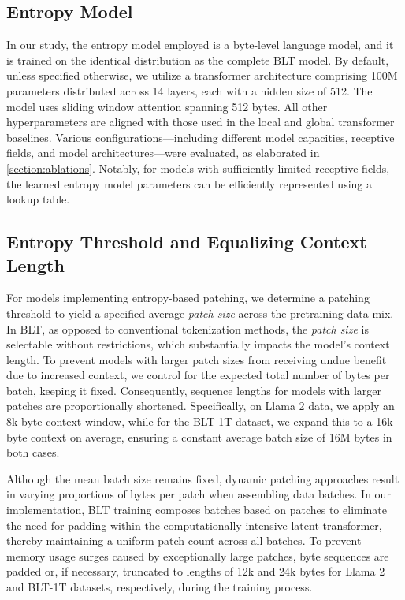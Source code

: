 \subsection{Entropy Model} In our study, the entropy model employed is a byte-level language model, and it is trained on the identical distribution as the complete {\textsc BLT} model. By default, unless specified otherwise, we utilize a transformer architecture comprising 100M parameters distributed across 14 layers, each with a hidden size of 512. The model uses sliding window attention spanning 512 bytes. All other hyperparameters are aligned with those used in the local and global transformer baselines. Various configurations—including different model capacities, receptive fields, and model architectures—were evaluated, as elaborated in \autoref{section:ablations}. Notably, for models with sufficiently limited receptive fields, the learned entropy model parameters can be efficiently represented using a lookup table.

\subsection{Entropy Threshold and Equalizing Context Length} For models implementing entropy-based patching, we determine a patching threshold to yield a specified average \textit{patch size} across the pretraining data mix. In {\textsc BLT}, as opposed to conventional tokenization methods, the \textit{patch size} is selectable without restrictions, which substantially impacts the model’s context length. To prevent models with larger patch sizes from receiving undue benefit due to increased context, we control for the expected total number of bytes per batch, keeping it fixed. Consequently, sequence lengths for models with larger patches are proportionally shortened. Specifically, on Llama 2 data, we apply an 8k byte context window, while for the {\textsc BLT}-1T dataset, we expand this to a 16k byte context on average, ensuring a constant average batch size of 16M bytes in both cases.

Although the mean batch size remains fixed, dynamic patching approaches result in varying proportions of bytes per patch when assembling data batches. In our implementation, {\textsc BLT} training composes batches based on patches to eliminate the need for padding within the computationally intensive latent transformer, thereby maintaining a uniform patch count across all batches. To prevent memory usage surges caused by exceptionally large patches, byte sequences are padded or, if necessary, truncated to lengths of 12k and 24k bytes for Llama 2 and {\textsc BLT}-1T datasets, respectively, during the training process.

